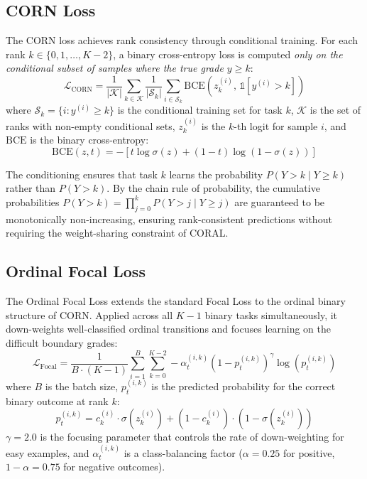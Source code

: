 \subsection{CORN Loss}
\label{sec:corn_loss}

The CORN loss \cite{shi2021corn} achieves rank consistency through conditional training. For each rank $k \in \{0, 1, \ldots, K-2\}$, a binary cross-entropy loss is computed \emph{only on the conditional subset of samples where the true grade $y \geq k$}:
\begin{equation}
    \mathcal{L}_{\text{CORN}} = \frac{1}{|\mathcal{K}|} \sum_{k \in \mathcal{K}} \frac{1}{|\mathcal{S}_k|} \sum_{i \in \mathcal{S}_k} \text{BCE}\left(z_k^{(i)}, \, \mathbb{1}[y^{(i)} > k]\right)
    \label{eq:corn_loss}
\end{equation}
where $\mathcal{S}_k = \{i : y^{(i)} \geq k\}$ is the conditional training set for task $k$, $\mathcal{K}$ is the set of ranks with non-empty conditional sets, $z_k^{(i)}$ is the $k$-th logit for sample $i$, and $\text{BCE}$ is the binary cross-entropy:
\begin{equation}
    \text{BCE}(z, t) = -\left[t \log \sigma(z) + (1-t) \log(1 - \sigma(z))\right]
\end{equation}

The conditioning ensures that task $k$ learns the probability $P(Y > k \mid Y \geq k)$ rather than $P(Y > k)$. By the chain rule of probability, the cumulative probabilities $P(Y > k) = \prod_{j=0}^{k} P(Y > j \mid Y \geq j)$ are guaranteed to be monotonically non-increasing, ensuring rank-consistent predictions without requiring the weight-sharing constraint of CORAL.

\subsection{Ordinal Focal Loss}
\label{sec:focal_loss}

The Ordinal Focal Loss extends the standard Focal Loss \cite{lin2017focal} to the ordinal binary structure of CORN. Applied across all $K-1$ binary tasks simultaneously, it down-weights well-classified ordinal transitions and focuses learning on the difficult boundary grades:
\begin{equation}
    \mathcal{L}_{\text{Focal}} = \frac{1}{B \cdot (K-1)} \sum_{i=1}^{B} \sum_{k=0}^{K-2} -\alpha_t^{(i,k)} \left(1 - p_t^{(i,k)}\right)^\gamma \log\left(p_t^{(i,k)}\right)
    \label{eq:focal_loss}
\end{equation}
where $B$ is the batch size, $p_t^{(i,k)}$ is the predicted probability for the correct binary outcome at rank $k$:
\begin{equation}
    p_t^{(i,k)} = c_k^{(i)} \cdot \sigma(z_k^{(i)}) + (1 - c_k^{(i)}) \cdot (1 - \sigma(z_k^{(i)}))
\end{equation}
$\gamma = 2.0$ is the focusing parameter that controls the rate of down-weighting for easy examples, and $\alpha_t^{(i,k)}$ is a class-balancing factor ($\alpha = 0.25$ for positive, $1 - \alpha = 0.75$ for negative outcomes).

